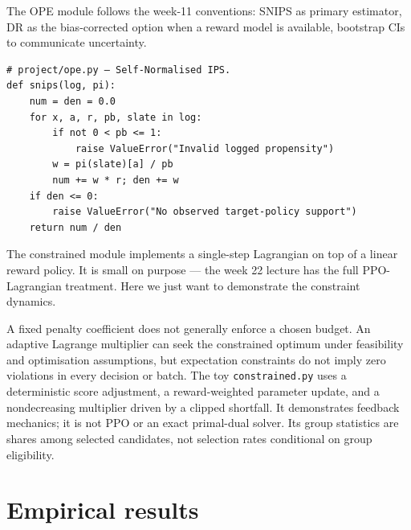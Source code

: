 \documentclass[11pt,oneside]{scrbook}
\begin{document}
The OPE module follows the week-11 conventions: SNIPS as primary
estimator, DR as the bias-corrected option when a reward model is
available, bootstrap CIs to communicate uncertainty.

\begin{codebox}
\begin{verbatim}
# project/ope.py — Self-Normalised IPS.
def snips(log, pi):
    num = den = 0.0
    for x, a, r, pb, slate in log:
        if not 0 < pb <= 1:
            raise ValueError("Invalid logged propensity")
        w = pi(slate)[a] / pb
        num += w * r; den += w
    if den <= 0:
        raise ValueError("No observed target-policy support")
    return num / den
\end{verbatim}
\end{codebox}

The constrained module implements a single-step Lagrangian on top of a
linear reward policy. It is small on purpose --- the week 22 lecture
has the full PPO-Lagrangian treatment. Here we just want to demonstrate
the constraint dynamics.

\begin{pitfall}
A fixed penalty coefficient does not generally enforce a chosen budget.
An adaptive Lagrange multiplier can seek the constrained optimum under
feasibility and optimisation assumptions, but expectation constraints do
not imply zero violations in every decision or batch. The toy
\texttt{constrained.py} uses a deterministic score adjustment, a
reward-weighted parameter update, and a nondecreasing multiplier driven by
a clipped shortfall. It demonstrates feedback mechanics; it is not PPO or
an exact primal-dual solver. Its group statistics are shares among selected
candidates, not selection rates conditional on group eligibility.
\end{pitfall}

\chapter{Empirical results}
\end{document}
